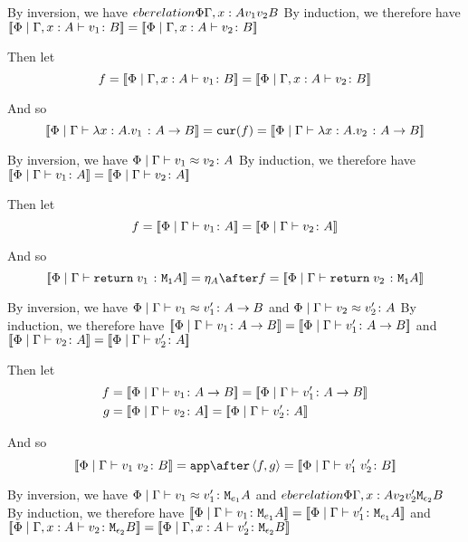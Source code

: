 {
    By inversion, we have $\\eberelation{\Phi}{\Gamma, x: A}{v_1}{v_2}{B}$
    By induction, we therefore have ${\bf [\![}\Phi\mid\Gamma, x: A \vdash v_1 \colon B{\bf ]\!]} = {\bf [\![}\Phi\mid\Gamma, x: A \vdash v_2 \colon B{\bf ]\!]}$

    Then let
    \begin{equation}
        f = {\bf [\![}\Phi\mid\Gamma, x: A \vdash v_1 \colon B{\bf ]\!]} = {\bf [\![}\Phi\mid\Gamma, x: A \vdash v_2 \colon B{\bf ]\!]}
    \end{equation}

    And so
    \begin{equation}
        {\bf [\![}\Phi\mid\Gamma \vdash \lambda x : A. v_1\; \colon A\rightarrow B{\bf ]\!]} = \texttt{cur}(f) = {\bf [\![}\Phi\mid\Gamma \vdash \lambda x : A. v_2\; \colon A\rightarrow B{\bf ]\!]}
    \end{equation}


By inversion, we have $\Phi\mid\Gamma \vdash v_1 \approx v_2 \colon A$
By induction, we therefore have ${\bf [\![}\Phi\mid\Gamma \vdash v_1 \colon A{\bf ]\!]} = {\bf [\![}\Phi\mid\Gamma \vdash v_2 \colon A{\bf ]\!]}$

Then let
\begin{equation}
    f = {\bf [\![}\Phi\mid\Gamma \vdash v_1 \colon A{\bf ]\!]} = {\bf [\![}\Phi\mid\Gamma \vdash v_2 \colon A{\bf ]\!]}
\end{equation}

And so
\begin{equation}
    \deno{\gpetyperelation{\return{v_1}}{\M{\1}{A}}} = \point{A}\after f = \deno{\gpetyperelation{\return{v_2}}{\M{\1}{A}}}
\end{equation}


By inversion, we have $\Phi\mid\Gamma \vdash v_1 \approx v_1' \colon A\rightarrow B$ and $\Phi\mid\Gamma \vdash v_2 \approx v_2' \colon A$
By induction, we therefore have ${\bf [\![}\Phi\mid\Gamma \vdash v_1 \colon A\rightarrow B{\bf ]\!]}= {\bf [\![}\Phi\mid\Gamma \vdash v_1' \colon A\rightarrow B{\bf ]\!]}$ and ${\bf [\![}\Phi\mid\Gamma \vdash v_2 \colon A{\bf ]\!]} = {\bf [\![}\Phi\mid\Gamma \vdash v_2' \colon A{\bf ]\!]}$

Then let
\begin{align}
    f &{}= \deno{\gpetyperelation{v_1}{\ab}} = \deno{\gpetyperelation{v_1'}{\ab}}\\
    g &{}= \deno{\gpetyperelation{v_2}{A}} = \deno{\gpetyperelation{v_2'}{A}}
\end{align}



And so
\begin{equation}
    \deno{\gpetyperelation{\apply{v_1}{v_2}}{B}} = \app\after\pr{f}{g} = \deno{\gpetyperelation{\apply{v_1'}{v_2'}}{B}}
\end{equation}


By inversion, we have $\Phi\mid\Gamma \vdash v_1 \approx v_1' \colon \texttt{M}_{e_1}{A}$ and $\\eberelation{\Phi}{\Gamma, x: A}{v_2}{v_2'}{\texttt{M}_{\epsilon_2}{B}}$
By induction, we therefore have ${\bf [\![}\Phi\mid\Gamma \vdash v_1 \colon \texttt{M}_{e_1}{A}{\bf ]\!]}= {\bf [\![}\Phi\mid\Gamma \vdash v_1' \colon \texttt{M}_{e_1}{A}{\bf ]\!]}$ and ${\bf [\![}\Phi\mid\Gamma, x: A \vdash v_2 \colon \texttt{M}_{\epsilon_2}{B}{\bf ]\!]} = {\bf [\![}\Phi\mid\Gamma, x: A \vdash v_2' \colon \texttt{M}_{\epsilon_2}{B}{\bf ]\!]}$

}
